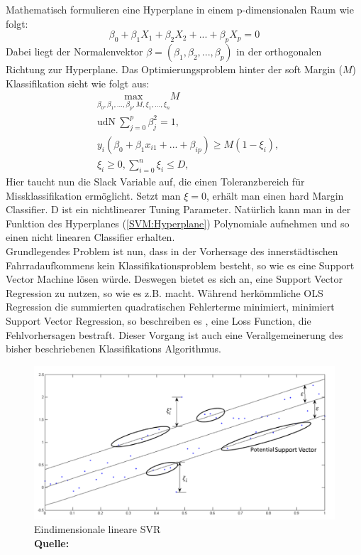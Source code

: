 \documentclass[a4paper,12pt]{thesis}
\newcommand*{\captionsource}[2]{%
	\caption[{#1}]{%
		#1%
		\\\hspace{\linewidth}%
		\textbf{Quelle:} #2%
	}%
}
\begin{document}
Mathematisch formulieren \cite{James2013SVM} eine Hyperplane in einem p-dimensionalen Raum wie folgt:
\begin{equation}
	\label{SVM:Hyperplane}
	\beta_0 + \beta_1 X_1 + \beta_2 X_2 + ... + \beta_p X_p = 0
\end{equation}
Dabei liegt der Normalenvektor $\beta=(\beta_1, \beta_2, ..., \beta_p)$ in der orthogonalen Richtung zur Hyperplane. Das Optimierungsproblem hinter der soft Margin ($M$) Klassifikation sieht wie folgt aus:
\begin{equation}
	\label{SVM:SoftMarginClassifier}
	\begin{aligned}
		&\underset{\beta_0, \beta_1, ... , \beta_p,M,\xi_1,...,\xi_n}{\text{max}}M \\
		&\text{udN}\: \sum_{j=0}^p\beta_j^2=1, \\
		&y_i(\beta_0 + \beta_1 x_{i1} + ... + \beta_{ip}) \geq M(1-\xi_i),\\
		&\xi_i \geq 0, \sum_{i=0}^n\xi_i \leq D,
	\end{aligned} 
\end{equation}
Hier taucht nun die Slack Variable auf, die einen Toleranzbereich für Missklassifikation ermöglicht. Setzt man $\xi=0$, erhält man einen hard Margin Classifier. D ist ein nichtlinearer Tuning Parameter. Natürlich kann man in der Funktion des Hyperplanes (\ref{SVM:Hyperplane}) Polynomiale aufnehmen und so einen nicht linearen Classifier erhalten.\\
Grundlegendes Problem ist nun, dass in der Vorhersage des innerstädtischen Fahrradaufkommens kein Klassifikationsproblem besteht, so wie es eine Support Vector Machine lösen würde. Deswegen bietet es sich an, eine Support Vector Regression zu nutzen, so wie es z.B. \cite{Holmgren2017} macht. Während herkömmliche OLS Regression die summierten quadratischen Fehlerterme minimiert, minimiert Support Vector Regression, so beschreiben es \cite{Awad2015}, eine Loss Function, die Fehlvorhersagen bestraft. Dieser Vorgang ist auch eine Verallgemeinerung des bisher beschriebenen Klassifikations Algorithmus.\\ 
\begin{figure}[!ht]
	\centering
	\includegraphics[width=\textwidth]{Plots/SVM3.png}
	\captionsource{Eindimensionale lineare SVR}{
		\cite{Awad2015}
	}
	\label{SVM3}
\end{figure}\\
\end{document}
